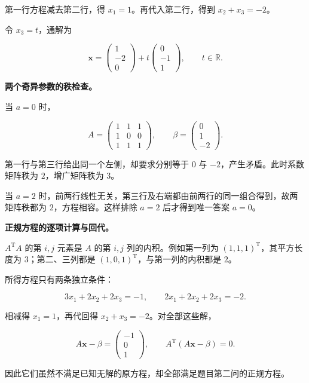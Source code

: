 \documentclass[UTF8,11pt,fontset=windows]{ctexart}
\begin{document}
第一行方程减去第二行，得 $x_1=1$。再代入第二行，得到 $x_2+x_3=-2$。

令 $x_3=t$，通解为

$$
\boldsymbol x=\begin{pmatrix}1\\-2\\0\end{pmatrix}
+t\begin{pmatrix}0\\-1\\1\end{pmatrix},\qquad t\in\mathbb R.
$$

\textbf{两个奇异参数的秩检查。}

当 $a=0$ 时，

$$
A=\begin{pmatrix}1&1&1\\1&0&0\\1&1&1\end{pmatrix},
\qquad\beta=\begin{pmatrix}0\\1\\-2\end{pmatrix}.
$$

第一行与第三行给出同一个左侧，却要求分别等于 $0$ 与 $-2$，产生矛盾。此时系数矩阵秩为 $2$，增广矩阵秩为 $3$。

当 $a=2$ 时，前两行线性无关，第三行及右端都由前两行的同一组合得到，故两矩阵秩都为 $2$，方程相容。这样排除 $a=2$ 后才得到唯一答案 $a=0$。

\textbf{正规方程的逐项计算与回代。}

$A^{\mathrm T}A$ 的第 $i,j$ 元素是 $A$ 的第 $i,j$ 列的内积。例如第一列为 $(1,1,1)^{\mathrm T}$，其平方长度为 $3$；第二、三列都是 $(1,0,1)^{\mathrm T}$，与第一列的内积都是 $2$。

所得方程只有两条独立条件：

$$
3x_1+2x_2+2x_3=-1,\qquad
2x_1+2x_2+2x_3=-2.
$$

相减得 $x_1=1$，再代回得 $x_2+x_3=-2$。对全部这些解，

$$
A\boldsymbol x-\beta=\begin{pmatrix}-1\\0\\1\end{pmatrix},
\qquad A^{\mathrm T}(A\boldsymbol x-\beta)=0.
$$

因此它们虽然不满足已知无解的原方程，却全部满足题目第二问的正规方程。

\clearpage
\end{document}
